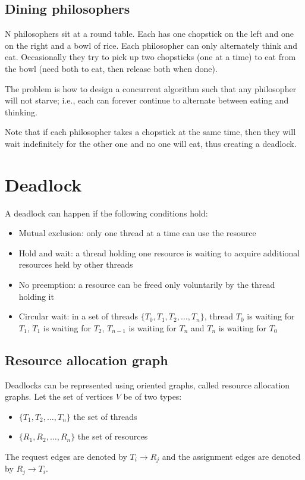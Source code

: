 

\subsection{Dining philosophers}
N philosophers sit at a round table. Each has one chopstick on the left and one on the right and a bowl of rice. Each philosopher can only alternately think and eat. Occasionally they try to pick up two chopsticks (one at a time) to eat from the bowl (need both to eat, then release both when done). 

The problem is how to design a concurrent algorithm such that any philosopher will not starve; i.e., each can forever continue to alternate between eating and thinking.

Note that if each philosopher takes a chopstick at the same time, then they will wait indefinitely for the other one and no one will eat, thus creating a deadlock.



\section{Deadlock}
A deadlock can happen if the following conditions hold:
\begin{itemize}
    \item Mutual exclusion: only one thread at a time can use the resource
    \item Hold and wait: a thread holding one resource is waiting to acquire additional resources held by other threads
    \item No preemption: a resource can be freed only voluntarily by the thread holding it
    \item Circular wait: in a set of threads $\{T_0, T_1, T_2, \dots , T_n\}$, thread $T_0$ is waiting for $T_1$, $T_1$ is waiting for $T_2$, $T_{n-1}$ is waiting for $T_n$ and $T_n$ is waiting for $T_0$
\end{itemize}

\subsection{Resource allocation graph}
Deadlocks can be represented using oriented graphs, called resource allocation graphs. Let the set of vertices $V$ be of two types:
\begin{itemize}
    \item $\{T_1, T_2, \dots, T_n\}$ the set of threads
    \item $\{R_1, R_2, \dots, R_n\}$ the set of resources
\end{itemize}
The request edges are denoted by $T_i \rightarrow R_j$ and the assignment edges are denoted by $R_j \rightarrow T_i$.

